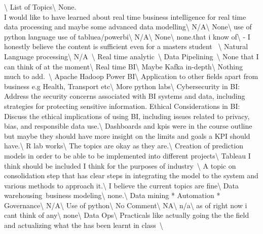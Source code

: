 \documentclass[
]{article}
\begin{document}
\textbackslash{} \toprule List of Topics\textbackslash{} \midrule
None.\\
\hline I would like to have learned about real time business
intelligence for real time data processing and maybe some advanced data
modelling\textbackslash{} \hline N/A\textbackslash{} \hline
None\textbackslash{} \hline use of python language use of
tabluea/powerbi\textbackslash{} \hline N/A\textbackslash{} \hline
None\textbackslash{} \hline none.that i know of\textbackslash{} \hline -
I honestly believe the content is sufficient even for a masters student
~\textbackslash{} \hline Natural Language processing\textbackslash{}
\hline N/A~\textbackslash{} \hline Real time analytic~\textbackslash{}
\hline Data Pipelining~\textbackslash{} \hline None that I can think of
at the moment\textbackslash{} \hline Real time BI\textbackslash{} \hline
Maybe Kafka in-depth\textbackslash{} \hline Nothing much to
add.~\textbackslash{} \hline Apache Hadoop Power BI\textbackslash{}
\hline Application to other fields apart from business e.g Health,
Transport etc\textbackslash{} \hline More python labs\textbackslash{}
\hline Cybersecurity in BI: Address the security concerns associated
with BI systems and data, including strategies for protecting sensitive
information. Ethical Considerations in BI: Discuss the ethical
implications of using BI, including issues related to privacy, bias, and
responsible data use.\textbackslash{} \hline Dashboards and kpis were in
the course outline but maybe they should have more insight on the limits
and goals a KPI should have.\textbackslash{} \hline R lab
works\textbackslash{} \hline The topics are okay as they
are.\textbackslash{} \hline Creation of prediction models in order to be
able to be implemented into different projects\textbackslash{} \hline
Tableau I think should be included I think for the purposes of
industry~\textbackslash{} \hline A topic on consolidation step that has
clear steps in integrating the model to the system and various methods
to approach it.\textbackslash{} \hline I believe the current topics are
fine\textbackslash{} \hline Data warehousing~business
modeling\textbackslash{} \hline none.\textbackslash{} \hline * Data
mining * Automation * Governance\textbackslash{} \hline
N/A\textbackslash{} \hline Use of python\textbackslash{} \hline No
Comment\textbackslash{} \hline NA\textbackslash{} \hline
n/a\textbackslash{} \hline as of right now i cant think of
any\textbackslash{} \hline none\textbackslash{} \hline Data
Ops\textbackslash{} \hline Practicals like actually going the the field
and actualizing what the has been learnt in class~\textbackslash{}
\end{document}
